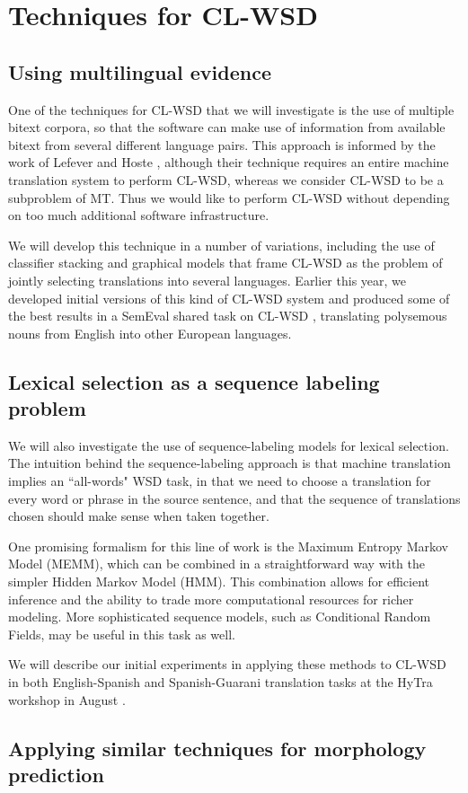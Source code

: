 \section{Techniques for CL-WSD}

\subsection{Using multilingual evidence}
One of the techniques for CL-WSD that we will investigate is the use of
multiple bitext corpora, so that the software can make use of information from
available bitext from several different language pairs. This approach is
informed by the work of Lefever and Hoste
\cite{lefever-hoste-decock:2011:ACL-HLT2011}, although their technique requires
an entire machine translation system to perform CL-WSD, whereas we consider
CL-WSD to be a subproblem of MT. Thus we would like to perform CL-WSD without
depending on too much additional software infrastructure.

We will develop this technique in a number of variations, including the use of
classifier stacking and graphical models that frame CL-WSD as the problem
of jointly selecting translations into several languages. Earlier this year,
we developed initial versions of this kind of CL-WSD system
\cite{rudnick-liu-gasser:2013:SemEval-2013} and produced some of the best
results in a SemEval shared task on CL-WSD \cite{task10},
translating polysemous nouns from English into other European languages.

\subsection{Lexical selection as a sequence labeling problem}
We will also investigate the use of sequence-labeling models for
lexical selection.  The intuition behind the sequence-labeling approach is that
machine translation implies an ``all-words" WSD task, in that we need to choose
a translation for every word or phrase in the source sentence, and that the
sequence of translations chosen should make sense when taken together.

One promising formalism for this line of work is the Maximum
Entropy Markov Model (MEMM), which can be combined in a straightforward way
with the simpler Hidden Markov Model (HMM). This combination allows for
efficient inference and the ability to trade more computational resources for
richer modeling. More sophisticated sequence models, such as Conditional Random
Fields, may be useful in this task as well.

We will describe our initial experiments in applying these methods to CL-WSD in
both English-Spanish and Spanish-Guarani translation tasks at the HyTra
workshop in August \cite{rudnick-gasser:2013:HyTra-2013}.

\subsection{Applying similar techniques for morphology prediction}
